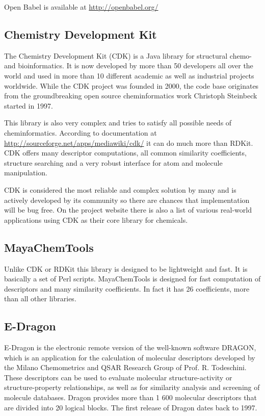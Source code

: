 \documentclass[thesis=M,english]{FITthesis}[2012/10/20]
\begin{document}
Open Babel is available at \url{http://openbabel.org/}


\subsection{Chemistry Development Kit}
The Chemistry Development Kit (CDK) is a Java library for structural chemo- and bioinformatics. It is now developed by more than 50 developers all over the world and used in more than 10 different academic as well as industrial projects worldwide\cite{cdk2}. While the CDK project was founded in 2000, the code base originates from the groundbreaking open source cheminformatics work Christoph Steinbeck started in 1997.\cite{cdk}

This library is also very complex and tries to satisfy all possible needs of cheminformatics. According to documentation at \url{http://sourceforge.net/apps/mediawiki/cdk/} it can do much more than RDKit. CDK offers many descriptor computations, all common similarity coefficients, structure searching and a very robust interface for atom and molecule manipulation. 

CDK is considered the most reliable and complex solution by many and is actively developed by its community so there are chances that implementation will be bug free. On the project website there is also a list of various real-world applications using CDK as their core library for chemicals.


\subsection{MayaChemTools}
Unlike CDK or RDKit this library is designed to be lightweight and fast. It is basically a set of Perl scripts. MayaChemTools is designed for fast computation of descriptors and many similarity coefficients. In fact it has 26 coefficients, more than all other libraries.


\subsection{E-Dragon}
E-Dragon is the electronic remote version of the well-known software DRAGON, which is an application for the calculation of molecular descriptors developed by the Milano Chemometrics and QSAR Research Group of Prof. R. Todeschini. These descriptors can be used to evaluate molecular structure-activity or structure-property relationships, as well as for similarity analysis and screening of molecule databases. Dragon provides more than 1 600 molecular descriptors that are divided into 20 logical blocks. The first release of Dragon dates back to 1997.\cite{dragon} 
\end{document}
